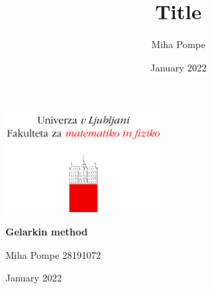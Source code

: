 \documentclass[12pt, a4paper]{article}
\title{Title}
\author{Miha Pompe}
\date{January 2022}
\begin{document}
\begin{titlepage}
	\centering
 	\includegraphics[width=0.45\textwidth]{logo_fmf_uni-lj_sl_veliki.png}\par\vspace{1cm}

	\vspace{1cm}

	\vspace{1.5cm}
	{\huge\bfseries Gelarkin method \par}
	\vspace{2cm}
	{\Large Miha Pompe 28191072\par}
	\vfill

	\vfill

	{\large January 2022\par}
\end{titlepage}
\thispagestyle{empty}
\clearpage
{}
\newpage
\end{document}
